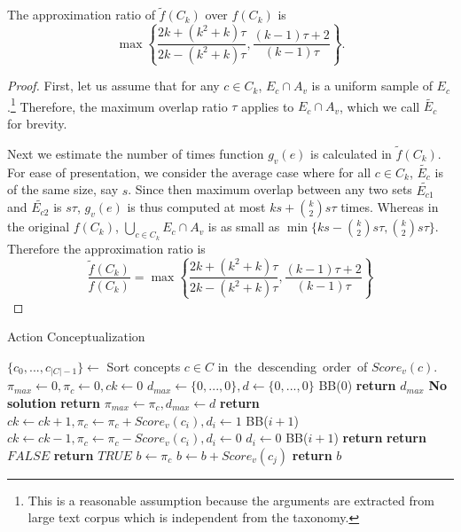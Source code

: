 \begin{lemma}
The approximation ratio of $\tilde{f}(C_k)$ over $f(C_k)$ is
\[\max \left\{
	\frac{2k + (k^2 + k) \tau}{2k - (k^2 + k) \tau},
	\frac{(k-1)\tau + 2}{(k-1)\tau}\right\}.\]
\end{lemma}
\begin{proof}
First, let us assume that for any $c \in C_k$, $E_c \cap A_v$ is a uniform
sample of $E_c$.\footnote{This is a reasonable assumption because the arguments
are extracted from large text corpus which is independent from the taxonomy.}
Therefore, the maximum overlap ratio $\tau$ applies
to $E_c \cap A_v$, which we call $\tilde{E_c}$ for brevity.

Next we estimate the number of times function $g_v(e)$
is calculated in $\tilde{f}(C_k)$. For ease of presentation,
we consider the average case where for all $c \in C_k$,
$\tilde{E_c}$ is of the same size, say $s$. Since then maximum overlap
between any two sets $\tilde{E_{c1}}$ and $\tilde{E_{c2}}$ is $s\tau$,
$g_v(e)$ is thus computed at most $ks + {k\choose 2}s\tau$ times.
Whereas in the original $f(C_k)$,
$\bigcup_{c \in C_k} E_c \cap A_v$
is as small as $\min\{ks - {k\choose 2}s\tau, {k\choose2}s\tau\}$.
Therefore the approximation ratio is
\[\frac{\tilde{f}(C_k)}{f(C_k)} = \max \left\{
	\frac{2k + (k^2 + k) \tau}{2k - (k^2 + k) \tau},
	\frac{(k-1)\tau + 2}{(k-1)\tau}\right\}
\]
\end{proof}

\begin{algorithm}[th]
\caption{Action Conceptualization}
\label{al:backtrack}
\begin{algorithmic}[1]
\State $\{c_0,...,c_{|C|-1}\}\leftarrow$ Sort concepts $c\in C$ in\ the\ descending\ order\ of $Score_v(c)$.
\State $\pi_{max} \leftarrow 0,\pi_{c} \leftarrow 0,ck \leftarrow 0$
\State $d_{max}\leftarrow\{0,...,0\},d\leftarrow\{0,...,0\}$
\State BB($0$)
\State \textbf{return} $d_{max}$
\Else
\State \textbf{No solution}
\EndIf
\EndFunction
\Statex
{}
\State \textbf{return}
\EndIf
{}
\State $\pi_{max} \leftarrow \pi_{c}, d_{max} \leftarrow d$
\EndIf
\State \textbf{return}
\EndIf
{}
\State $ck \leftarrow ck+1, \pi_{c} \leftarrow \pi_{c}+Score_v(c_i), d_i \leftarrow 1$
\State BB($i+1$)
\State $ck \leftarrow ck-1, \pi_{c} \leftarrow \pi_{c}-Score_v(c_i), d_i \leftarrow 0$
\EndIf
{}
\State $d_i \leftarrow 0$
\State BB($i+1$)
\EndIf
\State \textbf{return}
\EndFunction
\Statex
{}
\State \textbf{return} $FALSE$
\EndIf
\EndIf
\EndFor
\State \textbf{return} $TRUE$
\EndFunction
\Statex
{}
\State $b \leftarrow \pi_{c}$
\State $b \leftarrow b+Score_v(c_{j})$
\EndFor
\State \textbf{return} $b$
\EndFunction
\end{algorithmic}
\end{algorithm}

